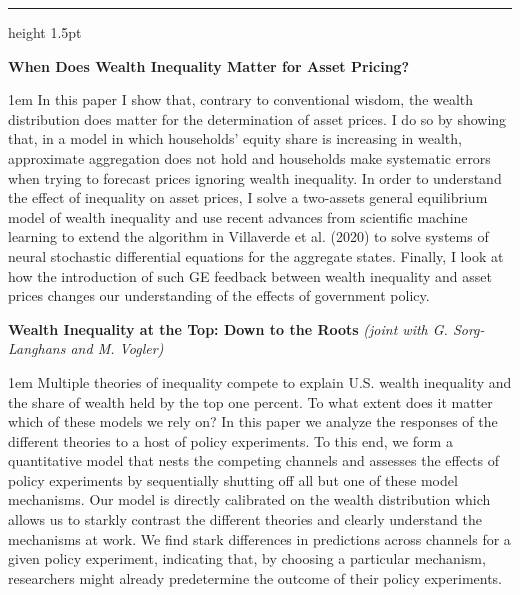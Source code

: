 \documentclass{resume} %
\renewenvironment{abstract}{\begin{adjustwidth}{1em}{}}{\end{adjustwidth}}
\newcommand\cinzel[1]{{\scfamily #1}}
\renewenvironment{rSection}[1]{
\sectionskip
{\color{accent_dark}\textsb{\cinzel{\Large{\textsc{#1}}}}}
\normalsize
\sectionlineskip
{\color{accent_dark}\vspace{-2.5pt}\hrule height 1.5pt}
\begin{list}{}{
\setlength{\leftmargin}{1.5em}
}
\item[]
}{
\end{list}
}
\begin{document}
\begin{rSection}{Other Papers}


{\sc \textbf{When Does Wealth Inequality Matter for Asset Pricing?}} \\[-1.5em]
{\begin{abstract}
    \footnotesize
    In this paper I show that, contrary to conventional wisdom, the wealth distribution does matter for the determination of asset prices.
    I do so by showing that, in a model in which households' equity share is increasing in wealth, approximate aggregation does not hold and households make systematic errors when trying to forecast prices ignoring wealth inequality.
    In order to understand the effect of inequality on asset prices, I solve a two-assets general equilibrium model of wealth inequality and use recent advances from scientific machine learning to extend the algorithm in Villaverde et al. (2020) to solve systems of neural stochastic differential equations for the aggregate states.
    Finally, I look at how the introduction of such GE feedback between wealth inequality and asset prices changes our understanding of the effects of government policy.
\end{abstract}}
\vspace*{0.5em}

\newpage

{{\sc \textbf{Wealth Inequality at the Top: Down to the Roots}} \hfill {\footnotesize \em (joint with G. Sorg-Langhans and M. Vogler)}} \\[-1.5em]
{\begin{abstract}
    \footnotesize
    Multiple theories of inequality compete to explain U.S. wealth inequality and the share of wealth held by the top one percent. To what extent does it matter which of these models we rely on? In this paper we analyze the responses of the different theories to a host of policy experiments. 
    To this end, we form a quantitative model that nests the competing channels and assesses the effects of policy experiments by sequentially shutting off all but one of these model mechanisms. Our model is directly calibrated on the wealth distribution which allows us to starkly contrast the different theories and clearly understand the mechanisms at work. We find stark differences in predictions across channels for a given policy experiment, indicating that, by choosing a particular mechanism, researchers might already predetermine the outcome of their policy experiments.
\end{abstract}}
\vspace*{0.5em}

\end{rSection}\vspace*{-2ex}
\end{document}
